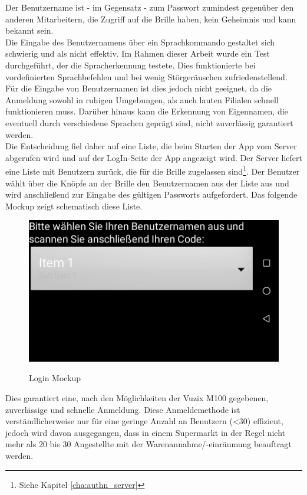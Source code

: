 Der Benutzername ist - im Gegensatz - zum Passwort zumindest gegenüber den anderen Mitarbeitern, die Zugriff auf die Brille haben, kein Geheimnis und kann bekannt sein.\\
Die Eingabe des Benutzernamens über ein Sprachkommando gestaltet sich schwierig und als nicht effektiv. Im Rahmen dieser Arbeit wurde ein Test durchgeführt, der die Spracherkennung testete. Dies funktionierte bei vordefinierten Sprachbefehlen und bei wenig Störgeräuschen zufriedenstellend. Für die Eingabe von Benutzernamen ist dies jedoch nicht geeignet, da die Anmeldung sowohl in ruhigen Umgebungen, als auch lauten Filialen schnell funktionieren muss. Darüber hinaus kann die Erkennung von Eigennamen, die eventuell durch verschiedene Sprachen geprägt sind, nicht zuverlässig garantiert werden.\\
Die Entscheidung fiel daher auf eine Liste, die beim Starten der App vom Server abgerufen wird und auf der LogIn-Seite der App angezeigt wird. Der Server liefert eine Liste mit Benutzern zurück, die für die Brille zugelassen sind\footnote{Siehe Kapitel \ref{cha:authn_server} }. Der Benutzer wählt über die Knöpfe an der Brille den Benutzernamen aus der Liste aus und wird anschließend zur Eingabe des gültigen Passworts aufgefordert. Das folgende Mockup zeigt schematisch diese Liste.\\
\begin{figure}[H]
	\centering
	{\includegraphics[scale=0.7]{Bilder/Abbildungen/login_mockup.png}}
	\caption{Login Mockup}
	\label{fig:sequenz_warenannnahme}
\end{figure}
Dies garantiert eine, nach den Möglichkeiten der Vuzix M100 gegebenen, zuverlässige und schnelle Anmeldung. Diese Anmeldemethode ist verständlicherweise nur für eine geringe Anzahl an Benutzern (<30) effizient, jedoch wird davon ausgegangen, dass in einem Supermarkt in der Regel nicht mehr als 20 bis 30 Angestellte mit der Warenannahme/-einräumung beauftragt werden.\\

